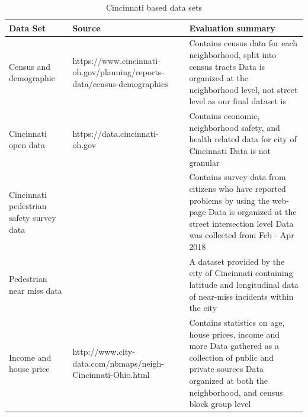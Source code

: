 \documentclass{llncs}
\begin{document}
\FloatBarrier
\begin{table}[!h]
\begin{center}
\caption{Cincinnati based data sets}
\label{table:cincinnatidatasets}
\begin{tabular}{ p{}  p{}  p{}}
\hline
\rule{0pt}{12pt}
Data Set
	& Source
	& Evaluation summary\\[2pt]
\hline
Census and demographic
	& https://www.cincinnati-oh.gov/planning/reports-data/census-demographics
	& Contains census data for each neighborhood, split into census tracts\newline
	Data is organized at the neighborhood level, not street level as our final dataset is\\
Cincinnati open data
	& https://data.cincinnati-oh.gov
	& Contains economic, neighborhood safety, and health related data for city of Cincinnati\newline
	Data is not granular\\
Cincinnati pedestrian safety survey data
	&
	& 
	Contains survey data from citizens who have reported problems by using the web-page\newline
	Data is organized at  the street intersection level\newline
	  Data was collected from Feb - Apr 2018\\
Pedestrian near miss data
	&
	& A dataset provided by the city of Cincinnati containing latitude and longitudinal data of near-miss incidents within the city\\
Income and house price
	& http://www.city-data.com/nbmaps/neigh-Cincinnati-Ohio.html
	& Contains statistics on age, house prices, income and more\newline
	Data gathered as a collection of public and private sources\newline
	Data organized at both the neighborhood, and census block group level\\[2pt]
\hline
\end{tabular}
\end{center}
\end{table}
\FloatBarrier
%
\FloatBarrier
\end{document}
